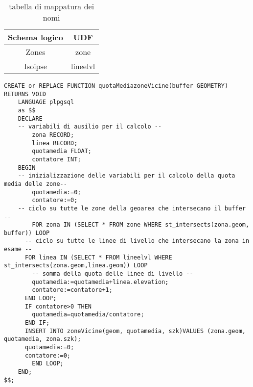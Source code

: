 \begin{table}[]
\centering
\caption{tabella di mappatura dei nomi}
\label{mapTb1}
\begin{tabular}{|c|c|}
\hline
Schema logico & UDF      \\ \hline
Zones         & zone     \\
Isoipse       & lineelvl \\ \hline
\end{tabular}
\end{table}

\newpage
\begin{lstlisting}[style=mySQL]
CREATE or REPLACE FUNCTION quotaMediazoneVicine(buffer GEOMETRY) RETURNS VOID
	LANGUAGE plpgsql
	as $$
	DECLARE
    -- variabili di ausilio per il calcolo --
		zona RECORD;
		linea RECORD;
		quotamedia FLOAT;
		contatore INT;
	BEGIN
    -- inizializzazione delle variabili per il calcolo della quota media delle zone--
		quotamedia:=0;
		contatore:=0;
    -- ciclo su tutte le zone della geoarea che intersecano il buffer --
		FOR zona IN (SELECT * FROM zone WHERE st_intersects(zona.geom, buffer)) LOOP
      -- ciclo su tutte le linee di livello che intersecano la zona in esame --
      FOR linea IN (SELECT * FROM lineelvl WHERE st_intersects(zona.geom,linea.geom)) LOOP
        -- somma della quota delle linee di livello --
        quotamedia:=quotamedia+linea.elevation;
        contatore:=contatore+1;
      END LOOP;
      IF contatore>0 THEN
        quotamedia=quotamedia/contatore;
      END IF;
      INSERT INTO zoneVicine(geom, quotamedia, szk)VALUES (zona.geom, quotamedia, zona.szk);
      quotamedia:=0;
      contatore:=0;
		END LOOP;
	END;
$$;
\end{lstlisting}